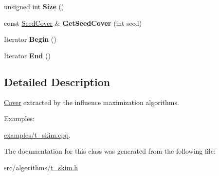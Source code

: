 \begin{DoxyCompactItemize}
\item 
\hypertarget{classall__distance__sketch_1_1Cover_ac11eae4d872b1d5bb1c8b781ab75b0b1}{}unsigned int {\bfseries Size} ()\label{classall__distance__sketch_1_1Cover_ac11eae4d872b1d5bb1c8b781ab75b0b1}

\item 
\hypertarget{classall__distance__sketch_1_1Cover_a9be9f7475ab8682cb3ff46ff71cef83c}{}const \hyperlink{namespaceall__distance__sketch_a2c159e46ed1a101b68cb2b23a58c4129}{Seed\+Cover} \& {\bfseries Get\+Seed\+Cover} (int seed)\label{classall__distance__sketch_1_1Cover_a9be9f7475ab8682cb3ff46ff71cef83c}

\item 
\hypertarget{classall__distance__sketch_1_1Cover_a13a97b2eb936508eeff66e9e938b7906}{}Iterator {\bfseries Begin} ()\label{classall__distance__sketch_1_1Cover_a13a97b2eb936508eeff66e9e938b7906}

\item 
\hypertarget{classall__distance__sketch_1_1Cover_a33a0fe311d66e5ce810a1c6f6cebcbe0}{}Iterator {\bfseries End} ()\label{classall__distance__sketch_1_1Cover_a33a0fe311d66e5ce810a1c6f6cebcbe0}

\end{DoxyCompactItemize}


\subsection{Detailed Description}
\hyperlink{classall__distance__sketch_1_1Cover}{Cover} extracted by the influence maximization algorithms. \begin{Desc}
\item[Examples\+: ]\par
\hyperlink{examples_2t_skim_8cpp-example}{examples/t\+\_\+skim.\+cpp}.\end{Desc}


The documentation for this class was generated from the following file\+:\begin{DoxyCompactItemize}
\item 
src/algorithms/\hyperlink{t__skim_8h}{t\+\_\+skim.\+h}\end{DoxyCompactItemize}
